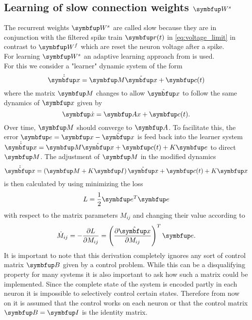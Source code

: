 \subsection{Learning of slow connection weights $\bmu{W}^s$}
The recurrent weights $\bmu{W}^s$ are called slow because they are in conjunction with the filtered spike train $\bmu{r}(t)$ in \cref{eq:voltage_limit} in contrast to $\bmu{W}^f$ which are reset the neuron voltage after a spike.\\
For learning $\bmu{W}^s$ an adaptive learning approach from \cite{bourdoukan_enforcing_nodate} is used.\\
For this we consider a "learner" dynamic system of the form
\begin{equation}
	\dot{\hat{\bmu{x}}} = \bmu{M}\hat{\bmu{x}} + \bmu{c}(t)
\end{equation}
where the matrix $\bmu{M}$ changes to allow $\hat{\bmu{x}}$ to follow the same dynamics of $\bmu{x}$ given by \begin{equation}
	\bmu{\dot{x}} = \bmu{Ax} + \bmu{c}(t).
\end{equation}
Over time, $\bmu{M}$ should converge to $\bmu{A}$. To facilitate this, the error $\bmu{e} = \bmu{x} - \hat{\bmu{x}}$ is feed back into the learner system $\dot{\hat{\bmu{x}}} =\bmu{M}\hat{\bmu{x}} + \bmu{c}(t)  + K\bmu{e}$ to direct $\bmu{M}$.
The adjustment of $\bmu{M}$ in the modified dynamics
\begin{equation}
	\dot{\hat{\bmu{x}}} = \left(\bmu{M} + K\bmu{I}\right)\hat{\bmu{x}} + \bmu{c}(t) + K\bmu{x}
\end{equation}
is then calculated by using minimizing the loss
\begin{equation}
	L = \frac{1}{2}\bmu{e}^T\bmu{e}
\end{equation}
with respect to the matrix parameters $M_{ij}$ and changing their value according to
\begin{equation}
	\dot{M}_{ij} = -\frac{\partial L}{\partial M_{ij}} = \left(\frac{\partial \hat{\bmu{x}}}{\partial M_{ij}}\right)^T\bmu{e}.
\end{equation}
It is important to note that this derivation completely ignores any sort of control matrix $\bmu{B}$ given by a control problem. While this can be a disqualifying property for many systems it is also important to ask how such a matrix could be implemented. Since the complete state of the system is encoded partly in each neuron it is impossible to selectively control certain states. Therefore from now on it is assumed that the control works on each neuron or that the control matrix $\bmu{B} = \bmu{I}$ is the identity matrix.
